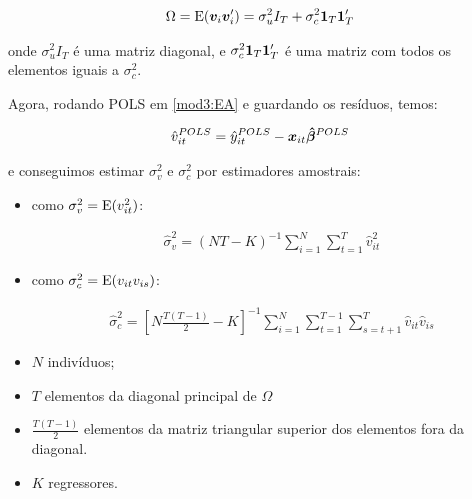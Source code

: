 \documentclass[11pt, oneside, a4paper, article]{article}
\numberwithin{equation}{section}
\begin{document}
\begin{description}
\begin{description}
\vspace{-1 em}
\begin{align*}
\Omega 
= 
\text{E}(\boldsymbol{v}_{i} \boldsymbol{v}_{i}') = \sigma^{2}_{u} I_{T} + \sigma_{c}^{2} \boldsymbol{1}_{T} \boldsymbol{1}_{T}'
\end{align*}

\noindent
onde
$\sigma^{2}_{u} I_{T}$ 
é uma matriz diagonal, e 
$\sigma_{c}^{2} \boldsymbol{1}_{T} \boldsymbol{1}_{T}'$ é uma matriz com todos os elementos iguais a $\sigma_{c}^{2}$.

Agora, rodando POLS em \eqref{mod3:EA} e guardando os resíduos, temos:

\vspace{-1 em}
\begin{align*}
\hat{v}_{it}^{POLS}
= 
\hat{y}_{it}^{POLS} - \boldsymbol{x}_{it} \boldsymbol{\hat{\beta}}^{POLS}
\end{align*}

\noindent
e conseguimos estimar $\sigma_{v}^{2}$ e $\sigma_{c}^{2}$ por estimadores amostrais:

\begin{itemize}\itemsep0pt
\item 
como $\sigma_{v}^{2} = \text{E}(v_{it}^{2})$:

\vspace{-1.5 em}
\begin{align*}
\hat{\sigma}_{v}^{2} =
(NT - K)^{-1} 
\sum_{i=1}^{N}
\sum_{t=1}^{T}
\hat{v}_{it}^2
\end{align*}
\vspace{-1.5 em}

\item 
como $\sigma_{c}^{2} = \text{E}(v_{it} v_{is})$:

\vspace{-1.5 em}
\begin{align*}
\hat{\sigma}_{c}^{2} =
\left[ N \frac{T ( T-1 )}{2} - K  \right]^{-1}
\sum_{i=1}^{N}
\sum_{t=1}^{T-1}
\sum_{s=t+1}^{T}
\hat{v}_{it} \hat{v}_{is}
\end{align*}
\vspace{-1.5 em}

\item $N$ indivíduos;

\item $T$ elementos da diagonal principal de $\Omega$

\item $\frac{T ( T - 1)}{2}$ elementos da matriz triangular superior dos elementos fora da diagonal.

\item $K$ regressores.
\end{itemize}


\end{description}
\end{description}
\end{document}
